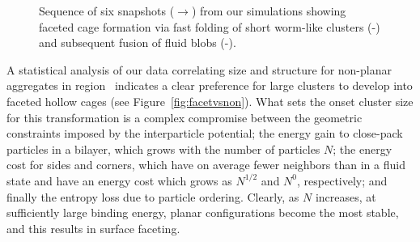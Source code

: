 \begin{figure}
\begin{center}
	\end{center}
	\caption[Snapshots of cage formation]{Sequence of six snapshots ($\rightarrow$) from our simulations showing faceted cage formation
	via fast folding of short worm-like clusters (-) and subsequent fusion of fluid blobs (-).}\label{fig:snapshots}
\end{figure}

A statistical analysis of our data correlating  size and structure for non-planar aggregates in region~ indicates a clear preference for large clusters to develop into  faceted hollow cages (see Figure~\ref{fig:facetvsnon}). 
What sets the onset cluster size for this transformation is a complex compromise between the geometric constraints imposed by the interparticle potential; the energy gain to close-pack particles in a bilayer, which grows with the number of particles $N$; the energy cost for sides and corners, which have on average fewer neighbors than in a fluid state and have an energy cost which grows as $ N^{1/2}$ and $N^{0}$, respectively; and finally the entropy loss due to particle ordering.
Clearly, as $N$ increases, at sufficiently large binding energy, planar configurations become the most stable, and this results in surface faceting.

